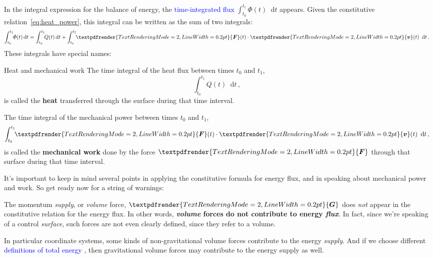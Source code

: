 \documentclass[a4paper,12pt,%
onecolumn,oneside,%
british%
]{memoir}
\renewcommand*{\bm}[1]{\textpdfrender{TextRenderingMode=2,LineWidth=0.2pt}{\boldsymbol{#1}}}
\newcommand*{\di}{\mathop{}\!\mathrm{d}}%
\renewcommand*{\|}[1][]{\nonscript\:#1\vert\nonscript\:\mathopen{}}
\newcommand*{\sect}{\S}%
\renewcommand*{\autoref}[3][\sect\,\ref]{\textcolor{blue}{#3}
\raisebox{0.6ex}{\color{blue}\miniscule%
\faIcon{angle-right}%
\;#1{#2}\;p.\,\pageref{#2}}}
\newcommand*{\yv}{\bm{v}}
\newcommand*{\yti}{t_{0}}
\newcommand*{\ytf}{t_{1}}
\newcommand*{\dt}{\di t}
\newcommand*{\yH}{\varPhi}%
\newcommand*{\yQ}{Q}%
\newcommand*{\yF}{\bm{F}}
\newcommand*{\yG}{\bm{G}}
\begin{document}
\medskip

In the integral expression for the balance of energy, the \autoref{sec:total_flow}{time-integrated flux} $\int_{\yti}^{\ytf}\!\!\yH(t)\dt$ appears. Given the constitutive relation~\eqref{eq:heat_power}, this integral can be written as the sum of two integrals:
\begin{equation*}
  \int_{\yti}^{\ytf}\!\!\yH(t)\dt =
  \int_{\yti}^{\ytf}\!\!\yQ(t)\dt
  + \int_{\yti}^{\ytf}\!\!\yF(t)\cdot \yv(t)\ \dt \,.
\end{equation*}
These integrals have special names:
\begin{definition}{Heat and mechanical work}\label{def:heatwork}
  The time integral of the heat flux between times $\yti$ and $\ytf$,
  \begin{equation*}
  \int_{\yti}^{\ytf}\!\!\yQ(t)\dt \,,
  \end{equation*}
  is called the \textbf{heat} transferred through the surface during that time interval.

  \smallskip

  The time integral of the mechanical power between times $\yti$ and $\ytf$,
  \begin{equation*}
  \int_{\yti}^{\ytf}\!\!\yF(t)\cdot \yv(t)\ \dt \,,
  \end{equation*}
  is called the \textbf{mechanical work} done by the force $\yF$ through that surface during that time interval.
\end{definition}

\medskip

It's important to keep in mind several points in applying the constitutive formula for energy flux, and in speaking about mechanical power and work. So get ready now for a string of warnings:
%
\begin{warning}[Momentum supply does not contribute to energy flux,label={warn:gravitywork}]
  The momentum \emph{supply}, or \emph{volume} force, $\yG$ does \emph{not} appear in the constitutive relation for the energy flux. In other words, \textbf{\emph{volume} forces do not contribute to energy \emph{flux}}. In fact, since we're speaking of a control \emph{surface}, such forces are not even clearly defined, since they refer to a volume.

\smallskip

In particular coordinate systems, some kinds of non-gravitational volume forces contribute to the energy \emph{supply}. And if we choose different \autoref{sec:energy_defs}{definitions of total energy}, then gravitational volume forces may contribute to the energy supply as well.
\end{warning}
\end{document}
